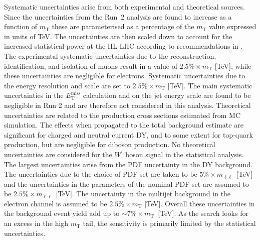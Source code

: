 Systematic uncertainties arise from both experimental and theoretical sources.
Since the uncertainties from the Run~2 analysis are found to increase as a function of $m_\mathrm{T}$
these are parameterised as a percentage of the $m_\mathrm{T}$ value expressed in units of TeV.
The uncertainties are then scaled down to account for the increased statistical power at the HL-LHC
according to recommendations in .
The experimental systematic uncertainties due to the reconstruction, identification, and isolation of
muons result in a value of $2.5\% \times m_{\mathrm T}$ [TeV], while these uncertainties are negligible
for electrons. 
Systematic uncertainties due to the energy resolution and scale are set to
$2.5\% \times m_{\mathrm T}$ [TeV].
The main systematic uncertainties in the $E_\mathrm{T}^\mathrm{miss}$ calculation and on the jet energy scale are found
to be negligible in Run 2 and are therefore not considered in this analysis.
Theoretical uncertainties are related to the production cross sections estimated from MC simulation.
The effects when propagated to the total background estimate are significant for charged and neutral current DY, and to some extent for top-quark production, but are negligible for diboson production.
No theoretical uncertainties are considered for the $W^\prime$ boson signal in the statistical analysis.
The largest uncertainties arise from the PDF uncertainty in the DY background.
The uncertainties due to the choice of PDF set are taken to be 
$5\% \times m_{\ell\ell}$~[TeV] and the uncertainties in the parameters of the nominal PDF set are assumed
to be $2.5\% \times m_{\ell\ell}$~[TeV]. 
The uncertainty in the multijet background in the electron channel is assumed to be
$2.5\% \times m_{\mathrm T}$ [TeV].
Overall these uncertainties in the background event yield add up to $\sim 7\% \times m_\mathrm{T}$~[TeV].
As the search looks for an excess in the high $m_\mathrm{T}$ tail, the sensitivity is primarily
limited by the statistical uncertainties.

